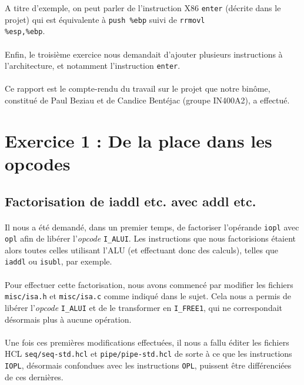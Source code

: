 \documentclass[12pt]{article}
\begin{document}
A titre d'exemple, on peut parler de l'instruction X86 \verb+enter+ (décrite dans le projet) qui est équivalente à \verb+push %ebp+ suivi de \verb+rrmovl+\\ \verb+%esp,%ebp+.

\paragraph{}Enfin, le troisième exercice nous demandait d'ajouter plusieurs instructions à l'architecture, et notamment l'instruction \verb+enter+.

\paragraph{}Ce rapport est le compte-rendu du travail sur le projet que notre binôme, constitué de Paul Beziau et de Candice Bentéjac (groupe IN400A2), a effectué.

\newpage


\section{Exercice 1 : De la place dans les opcodes}
\subsection{Factorisation de iaddl etc. avec addl etc.}
\paragraph{}Il nous a été demandé, dans un premier temps, de factoriser l'opérande \verb+iopl+ avec \verb+opl+ afin de libérer l'{\itshape opcode} \verb+I_ALUI+. Les instructions que nous factorisions étaient alors toutes celles utilisant l'ALU (et effectuant donc des calculs), telles que \verb+iaddl+ ou \verb+isubl+, par exemple.

\paragraph{}Pour effectuer cette factorisation, nous avons commencé par modifier les fichiers \verb+misc/isa.h+ et \verb+misc/isa.c+ comme indiqué dans le sujet. Cela nous a permis de libérer l'{\itshape opcode} \verb+I_ALUI+ et de le transformer en \verb+I_FREE1+, qui ne correspondait désormais plus à aucune opération.

\paragraph{}Une fois ces premières modifications effectuées, il nous a fallu éditer les fichiers HCL \verb+seq/seq-std.hcl+ et \verb+pipe/pipe-std.hcl+ de sorte à ce que les instructions \verb+IOPL+, désormais confondues avec les instructions \verb+OPL+, puissent être différenciées de ces dernières.
\end{document}
